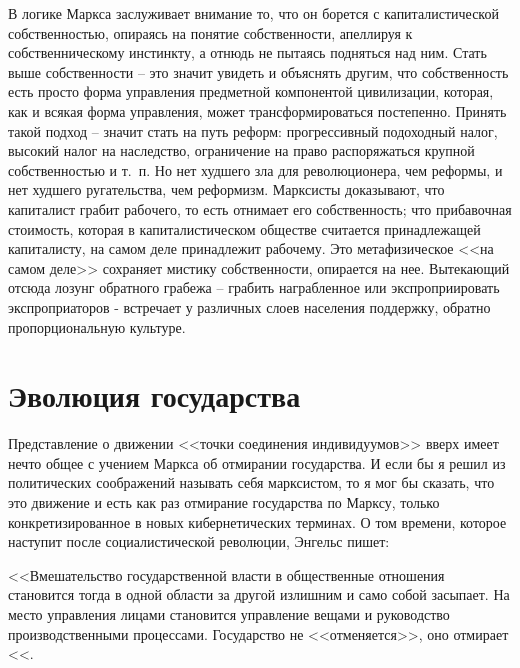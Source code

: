 \documentclass{book}
\begin{document}
В логике Маркса заслуживает внимание то, что он борется с капиталистической собственностью, опираясь на понятие соб­ственности, апеллируя к собственническому инстинкту, а отнюдь не пытаясь подняться над ним. Стать выше собственности -- это значит увидеть и объяснять другим, что собственность есть просто форма управления предметной компонентой цивилиза­ции, которая, как и всякая форма управления, может транс­формироваться постепенно. Принять такой подход -- значит стать на путь реформ: прогрессивный подоходный налог, высо­кий налог на наследство, ограничение на право распоряжаться крупной собственностью и т.~п. Но нет худшего зла для рево­люционера, чем реформы, и нет худшего ругательства, чем ре­формизм. Марксисты доказывают, что капиталист грабит  рабо­чего, то есть отнимает его собственность;  что прибавочная сто­имость, которая в капиталистическом обществе считается при­надлежащей капиталисту, на самом деле  принадлежит рабочему. Это метафизическое <<на самом деле>> сохраняет мистику собст­венности, 
опирается на нее. Вытекающий отсюда лозунг обрат­ного грабежа -- грабить награбленное или экспроприировать экспроприаторов - встречает у различных слоев населения поддержку, обратно пропорциональную культуре.


\section{Эволюция государства}

Представление о движении <<точки соединения индивиду­умов>> вверх имеет нечто общее с учением Маркса об отмира­нии государства. И если бы я решил из политических сообра­жений называть себя марксистом, то я мог бы сказать, что это движение и есть как раз отмирание государства по Марксу, только конкретизированное в новых кибернетических терми­нах. О том времени, которое наступит после социалистической революции, Энгельс пишет:

<<Вмешательство государственной власти в общественные отношения становится тогда в одной области за другой излиш­ним и само собой засыпает. На место управления лицами стано­вится управление вещами и руководство производственными процессами. Государство не <<отменяется>>, оно отмирает <<. 
\end{document}
